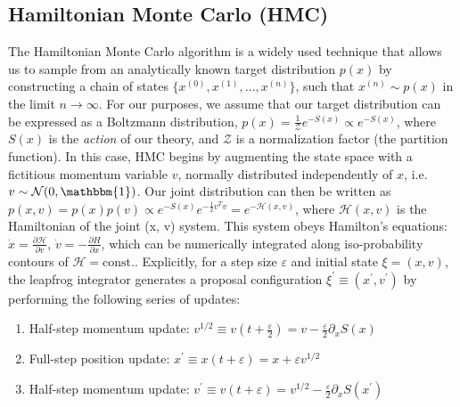 \documentclass{article} %
\begin{document}
\subsection{\label{subsec:HMC}Hamiltonian Monte Carlo (HMC)}
%
The Hamiltonian Monte Carlo algorithm is a widely used technique that allows us to sample from an analytically known
target distribution \(p(x)\) by constructing a chain of states \(\{x^{(0)}, x^{(1)}, \ldots, x^{(n)}\}\), such that
\(x^{(n)}\sim p(x)\) in the limit \(n\rightarrow\infty\).
%
For our purposes, we assume that our target distribution can be expressed as a Boltzmann distribution, \(p(x) =
\tfrac{1}{\mathcal{Z}} e^{-S(x)}\propto e^{-S(x)}\), where \(S(x)\) is the \emph{action} of our theory, and
\(\mathcal{Z}\) is a normalization factor (the partition function).
%
In this case, HMC begins by augmenting the state space with a fictitious momentum variable \(v\), normally
distributed independently of \(x\), i.e.\ \(v\sim\mathcal{N}(0, \mathbbm{1})\).
%
Our joint distribution can then be written as \(%
   p(x, v) = p(x) p(v) \propto e^{-S(x)} e^{-\frac{1}{2}v^{T}v} = e^{-\mathcal{H}(x, v)}
\), where \(\mathcal{H}(x, v)\) is the Hamiltonian of the joint (x, v) system.
%
This system obeys Hamilton's equations: %
\(\dot{x} = \frac{\partial\mathcal{H}}{\partial v}\), \(\dot{v} = -\frac{\partial H}{\partial x}\), which can be 
numerically integrated along iso-probability contours of \(\mathcal{H} = \text{const.}\).
%
Explicitly, for a step size \(\varepsilon\) and initial state \(\xi = (x, v)\), the leapfrog integrator generates a
proposal configuration \(\xi^{\prime} \equiv (x^{\prime}, v^{\prime})\) by performing the following series of updates: 
%
%
\begin{enumerate}
   \item Half-step momentum update: \hspace{12pt}\(%
      v^{1/2} \equiv v{\left(t+\frac{\varepsilon}{2}\right)} = v-\frac{\varepsilon}{2}\partial_{x}S(x)
   \)
   \item Full-step position update: \hspace{36pt}\(%
      x^{\prime} \equiv x(t+\varepsilon) = x + \varepsilon v^{1/2}
   \)
   \item Half-step momentum update:
      \hspace{18pt} \(%
         v^{\prime} \equiv v(t+\varepsilon) = v^{1/2} - \frac{\varepsilon}{2}\partial_{x} S(x^{\prime})
   \)
\end{enumerate}
\end{document}
